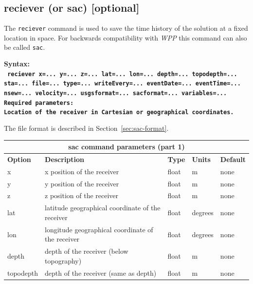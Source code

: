 \documentclass[11pt]{report}
\begin{document}
\subsection{reciever (or sac) [optional]}
The \verb+reciever+ command is used to save the time history of the solution at a fixed
location in space. For backwards compatibility with \emph{WPP} this command can also be called
\verb+sac+.
\begin{flushleft}
\bf
Syntax:\\
\tt
reciever x=... y=... z=... lat=... lon=... depth=... topodepth=... sta=... file=... type=... writeEvery=... eventDate=... eventTime=... nsew=... velocity=... usgsformat=... sacformat=... variables=...
\\
\bf Required parameters:\\
\rm Location of the receiver in Cartesian or geographical coordinates.
\end{flushleft}
%
The file format is described in Section~\ref{sec:sac-format}.
%
\begin{center}
\begin{tabular}{|l|p{8cm}|l|l|l|} \hline
\multicolumn{5}{|c|}{\bf sac command parameters (part 1)}\\ \hline
\bf{Option} & \bf{Description} & \bf{Type} & \bf{Units} & \bf{Default} \\ \hline \hline
x & x position of the receiver & float & m & none \\ \hline
y & y position of the receiver & float & m & none \\ \hline
z & z position of the receiver & float & m & none \\ \hline
\hline
lat & latitude geographical coordinate of the receiver & float & degrees & none \\ \hline
lon & longitude geographical coordinate of the receiver & float & degrees & none \\ \hline
depth & depth of the receiver (below topography) & float & m & none \\ \hline
topodepth & depth of the receiver (same as depth) & float & m & none \\ \hline
\end{tabular}
\end{center}
\end{document}
